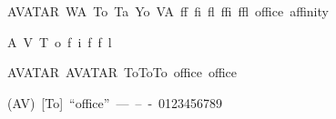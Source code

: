 \documentclass[12pt,letterpaper]{article}
\begin{document}
\mbox{AVATAR WA To Ta Yo VA ff fi fl ffi ffl office affinity}

\mbox{A\kern0pt V T\kern0pt o f\kern0pt i f\kern0pt f\kern0pt l}

\mbox{AVATAR AVATAR ToToTo office office}

\mbox{(AV) [To] ``office'' --- -- - 0123456789}
\end{document}
